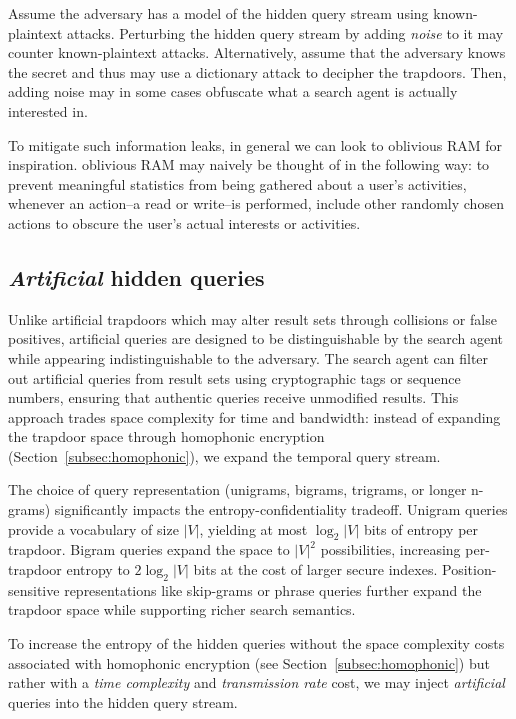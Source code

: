 \documentclass[final,11pt]{article}
\numberwithin{equation}{section}
\theoremstyle{plain}
\theoremstyle{remark}
\begin{document}
Assume the adversary has a model of the hidden query stream using known-plaintext attacks. Perturbing the hidden query stream by adding \emph{noise} to it may counter known-plaintext attacks. Alternatively, assume that the adversary knows the secret and thus may use a dictionary attack to decipher the trapdoors. Then, adding noise may in some cases obfuscate what a search agent is actually interested in. 

To mitigate such information leaks, in general we can look to oblivious RAM for inspiration. oblivious RAM may naively be thought of in the following way: to prevent meaningful statistics from being gathered about a user’s activities, whenever an action--a read or write--is performed, include other randomly chosen actions to obscure the user’s actual interests or activities.

\subsection{\emph{Artificial} hidden queries}
%
Unlike artificial trapdoors which may alter result sets through collisions or false positives, artificial queries are designed to be distinguishable by the search agent while appearing indistinguishable to the adversary. The search agent can filter out artificial queries from result sets using cryptographic tags or sequence numbers, ensuring that authentic queries receive unmodified results. This approach trades space complexity for time and bandwidth: instead of expanding the trapdoor space through homophonic encryption (Section~\ref{subsec:homophonic}), we expand the temporal query stream.

The choice of query representation (unigrams, bigrams, trigrams, or longer n-grams) significantly impacts the entropy-confidentiality tradeoff. Unigram queries provide a vocabulary of size $|V|$, yielding at most $\log_2 |V|$ bits of entropy per trapdoor. Bigram queries expand the space to $|V|^2$ possibilities, increasing per-trapdoor entropy to $2\log_2 |V|$ bits at the cost of larger secure indexes. Position-sensitive representations like skip-grams or phrase queries further expand the trapdoor space while supporting richer search semantics.

To increase the entropy of the hidden queries without the space complexity costs associated with homophonic encryption (see Section~\ref{subsec:homophonic}) but rather with a \emph{time complexity} and \emph{transmission rate} cost, we may inject \emph{artificial} queries into the hidden query stream.
\end{document}
